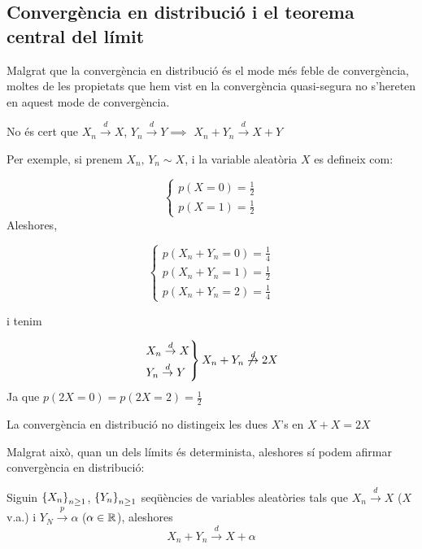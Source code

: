 \subsection{Convergència en distribució i el teorema central del límit}

Malgrat que la convergència en distribució és el mode més feble de convergència, moltes de les
propietats que hem vist en la convergència quasi-segura no s'hereten en aquest mode de convergència.

\begin{example}
  No és cert que $X_n \overset{d}{\to} X$, $Y_n \overset{d}{\to} Y \implies$ $X_n + Y_n \overset{d}{\to} X+Y$
  
  Per exemple, si prenem $X_n, \, Y_n \sim X$, i la variable aleatòria $X$ es defineix com:
  
  \[
    \begin{cases}
      p(X=0) = \frac{1}{2} \\
      p(X=1) = \frac{1}{2}
    \end{cases}
  \]
  Aleshores,
  
  \[
    \begin{cases}
      p(X_n + Y_n = 0) = \frac{1}{4} \\
      p(X_n + Y_n = 1) = \frac{1}{2} \\
      p(X_n + Y_n = 2) = \frac{1}{4}
    \end{cases}
  \]
  
  i tenim
  
  \[
  \begin{rcases}
      X_n \overset{d}{\to} X \\
      Y_n \overset{d}{\to} Y
    \end{rcases}
    X_n + Y_n \not\overset{d}{\to} 2X
  \]
  Ja que $p(2X = 0) = p(2X=2) = \frac{1}{2}$
  
  La convergència en distribució no distingeix les dues $X$'s en $X + X = 2X$
\end{example}

Malgrat això, quan un dels límits és determinista, aleshores sí podem afirmar convergència en 
distribució:

\begin{prop}
  Siguin $\left\{X_n\right\}_{n\geq1}$, $\left\{Y_n\right\}_{n\geq1}$ seqüències de variables aleatòries tals que 
  $X_n \overset{d}{\to} X$ ($X$ v.a.) i $Y_N \overset{p}{\to} \alpha$ ($\alpha \in \mathbb{R}$), aleshores
  \[
    X_n + Y_n \overset{d}{\to} X + \alpha
  \]
\end{prop}

